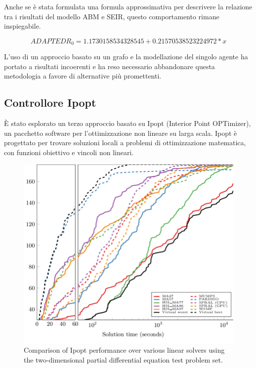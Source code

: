 Anche se è stata formulata una formula approssimativa per 
descrivere la relazione tra i risultati del modello ABM e SEIR, 
questo comportamento rimane inspiegabile. 

$$ ADAPTED R_0 = 1.1730158534328545 + 0.21570538523224972 * x $$

L'uso di un approccio basato su un grafo e la modellazione del 
singolo agente ha portato a risultati incoerenti e ha reso necessario 
abbandonare questa metodologia a favore di alternative più promettenti.
\newpage

\subsection{Controllore Ipopt}

È stato esplorato un terzo approccio basato su Ipopt 
(Interior Point OPTimizer), un pacchetto software per l'ottimizzazione 
non lineare su larga scala. Ipopt è progettato per trovare soluzioni 
locali a problemi di ottimizzazione matematica, con funzioni obiettivo e 
vincoli non lineari. \cite{Wächter2006}

\begin{figure}[H]
	\begin{center}
		\includegraphics[width=\textwidth]{img/Comparison-of-Ipopt-performance-over-various-linear-solvers-using-the-two-dimensional.png}
		\caption{Comparison of Ipopt performance over various linear solvers using the two-dimensional partial differential equation test problem set. \cite{tasseff2019exploring}}
		\label{fig:Ipopt_solver}	
    \end{center}
\end{figure}

